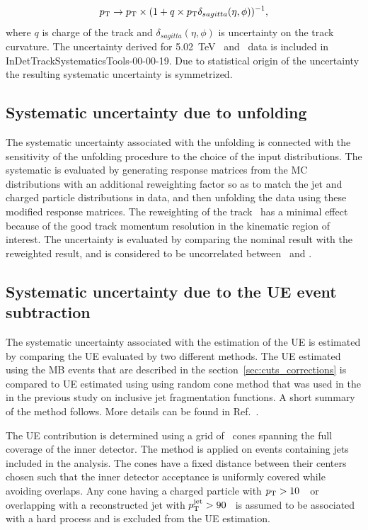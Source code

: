 \begin{equation}
\pt \rightarrow \pt \times (1 + q \times \pt \delta_{sagitta}(\eta, \phi))^{-1},
\end{equation}
where $q$ is charge of the track and $\delta_{sagitta}(\eta, \phi)$ is uncertainty on the track curvature. The uncertainty derived for 5.02~TeV \pp\ and \PbPb\ data is included in InDetTrackSystematicsTools-00-00-19. Due to statistical origin of the uncertainty the resulting systematic uncertainty is symmetrized. 


\subsection{Systematic uncertainty due to unfolding}
The systematic uncertainty associated with the unfolding is connected with the sensitivity of the unfolding procedure to the choice of the input distributions. The systematic is evaluated by generating response matrices from the MC distributions with an additional reweighting factor so as to match the jet and charged particle distributions in data, and then unfolding the data using these modified response matrices. The reweighting of the track \pt\ has a minimal effect because of the good track momentum resolution in the kinematic region of interest. The uncertainty is evaluated by comparing the nominal result with the reweighted result, and is considered to be uncorrelated between \pbpb\ and \pp.


\subsection{Systematic uncertainty due to the UE event subtraction}
The systematic uncertainty associated with the estimation of the UE is estimated by comparing the UE evaluated by two different methods. The UE estimated using the MB events that are described in the section~\ref{sec:cuts_corrections} is compared to UE estimated using using random cone method that was used in the in the previous study on inclusive jet fragmentation functions. A short summary of the method follows. More details can be found in Ref.~\cite{PbPb5TeVIntNote}. 

The UE contribution is determined using a grid of \RFour\ cones spanning the full coverage of the inner detector. The method is applied on events containing jets included in the analysis. The cones have a fixed distance between their centers chosen such that the inner detector acceptance is uniformly covered while avoiding overlaps. Any cone having a charged particle with $p_{\mathrm{T}}>10$~\GeV\ or overlapping with a reconstructed jet with $\mbox{$p_{\mathrm{T}}^{\mathrm{jet}}$} > 90$ \GeV\  is assumed to be associated with a 
hard process and is excluded from the UE estimation.


